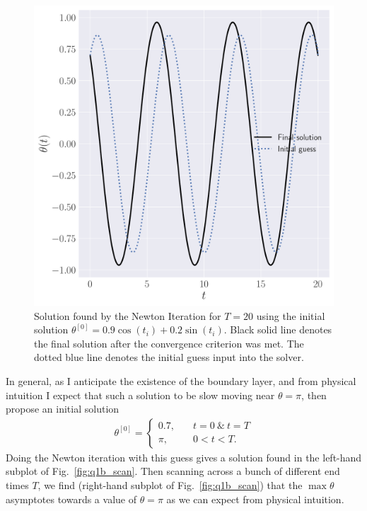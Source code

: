 \documentclass[12pt]{article}
\begin{document}
\begin{figure}
	\centering
	\includegraphics[clip,scale=0.3]{q1b_long_figure.pdf}
    \caption{
        Solution found by the Newton Iteration for $T=20$ using the initial solution $\theta^{[0]}=0.9\cos(t_{i})+0.2\sin(t_{i})$.
        Black solid line denotes the final solution after the convergence criterion was met. The dotted blue line denotes the initial guess
        input into the solver.
    }
    \label{fig:q1b_long}
\end{figure}

In general, as I anticipate the existence of the boundary layer, and from physical intuition I expect that such a solution to be slow moving near $\theta=\pi$, then propose an initial solution 
\begin{align}
	\theta^{[0]} = 
	\begin{cases}
		0.7,&\quad t=0\ \&\ t=T\\
		\pi,&\quad 0 < t < T.
	\end{cases}\label{eq:theta_init}
\end{align}
Doing the Newton iteration with this guess gives a solution found in the left-hand subplot of Fig.~\ref{fig:q1b_scan}. Then scanning across a bunch of different end times $T$, we find (right-hand subplot of Fig.~\ref{fig:q1b_scan}) that the $\max \theta$ asymptotes towards a value of $\theta = \pi$ as we can expect from physical intuition. 
\end{document}

